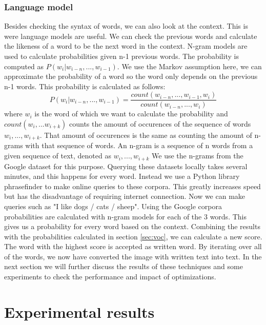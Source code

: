 \documentclass{article}
\begin{document}
\subsubsection{Language model}
\label{sec:lm}
Besides checking the syntax of words, we can also look at the context. This is were language models are useful. We can check the previous words and calculate the likeness of a word to be the next word in the context. N-gram models are used to calculate probabilities given n-1 previous words. The probability is computed as $P(w_i | w_{i-n},...,w_{i-1})$. We use the Markov assumption here, we can approximate the probability of a word so the word only depends on the previous n-1 words. This probability is calculated as follows: 
\begin{equation}
        P(w_i | w_{i-n},...,w_{i-1}) = \frac{count(w_{i-n},...,w_{i-1},w_{i})}{count(w_{i-n},...,w_i)}
\end{equation}
where $w_i$ is the word of which we want to calculate the probability and $count(w_i,...w_{i+k})$ counts the amount of occurences of the sequence of words $w_i,...,w_{i+k}$. That amount of occurences is the same as counting the amount of n-grams with that sequence of words. An n-gram is a sequence of n words from a given sequence of text, denoted as $w_i,...,w_{i+k}$ 
We use the n-grams from the Google dataset for this purpose. Querying these datasets locally takes several minutes, and this happens for every word. Instead we use a Python library phrasefinder to make online queries to these corpora. This greatly increases speed but has the disadvantage of requiring internet connection. 
Now we can make queries such as "I like dogs / cats / sheep". Using the Google corpora probabilities are calculated with n-gram models for each of the 3 words. This gives us a probability for every word based on the context. 
Combining the results with the probabilities calculated in section \ref{sec:voc}, we can 
calculate a new score. The word with the highest score is accepted as written word. By iterating over all of the words, we now have converted the image with written text into text. In the next section we will
further discuss the results of these techniques and some experiments to check the performance and impact of optimizations. 
\section{Experimental results}
\end{document}
